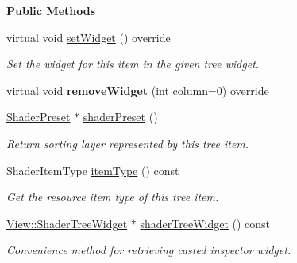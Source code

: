 \begin{Indent}\textbf{ Public Methods}\par
\begin{DoxyCompactItemize}
\item 
virtual void \mbox{\hyperlink{classrev_1_1_view_1_1_shader_tree_item_af7456acaae6ab27a4c215a1ee9cdf930}{set\+Widget}} () override
\begin{DoxyCompactList}\small\item\em Set the widget for this item in the given tree widget. \end{DoxyCompactList}\item 
\mbox{\label{classrev_1_1_view_1_1_shader_tree_item_a8399c61de7e6e49f8f10a83e9b3d2f12}} 
virtual void {\bfseries remove\+Widget} (int column=0) override
\item 
\mbox{\label{classrev_1_1_view_1_1_shader_tree_item_a31bb8cd0912fb5b93de909319d4e7a73}} 
\mbox{\hyperlink{classrev_1_1_shader_preset}{Shader\+Preset}} $\ast$ \mbox{\hyperlink{classrev_1_1_view_1_1_shader_tree_item_a31bb8cd0912fb5b93de909319d4e7a73}{shader\+Preset}} ()
\begin{DoxyCompactList}\small\item\em Return sorting layer represented by this tree item. \end{DoxyCompactList}\item 
\mbox{\label{classrev_1_1_view_1_1_shader_tree_item_a584f2bbdcdc412c785857bb2af103977}} 
Shader\+Item\+Type \mbox{\hyperlink{classrev_1_1_view_1_1_shader_tree_item_a584f2bbdcdc412c785857bb2af103977}{item\+Type}} () const
\begin{DoxyCompactList}\small\item\em Get the resource item type of this tree item. \end{DoxyCompactList}\item 
\mbox{\label{classrev_1_1_view_1_1_shader_tree_item_a806fb3144f055fee3e4352c09375e57f}} 
\mbox{\hyperlink{classrev_1_1_view_1_1_shader_tree_widget}{View\+::\+Shader\+Tree\+Widget}} $\ast$ \mbox{\hyperlink{classrev_1_1_view_1_1_shader_tree_item_a806fb3144f055fee3e4352c09375e57f}{shader\+Tree\+Widget}} () const
\begin{DoxyCompactList}\small\item\em Convenience method for retrieving casted inspector widget. \end{DoxyCompactList}\end{DoxyCompactItemize}
\end{Indent}
